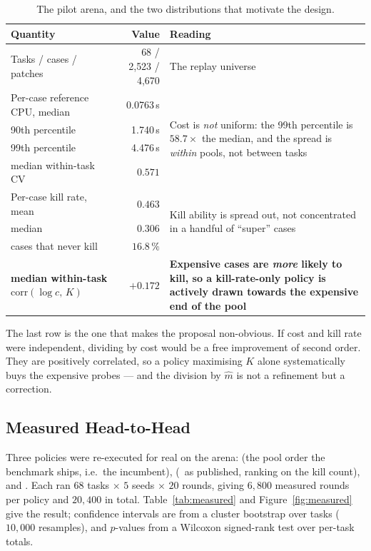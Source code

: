\begin{table}[H]
\centering
\caption{The pilot arena, and the two distributions that motivate the design.}
\label{tab:arena}
\small
\begin{tabularx}{\textwidth}{@{}l r X@{}}
\toprule
Quantity & Value & Reading\\
\midrule
Tasks / cases / patches & 68 / 2{,}523 / 4{,}670 & The replay universe\\
\midrule
Per-case reference CPU, median & 0.0763\,s & \multirow{4}{=}{Cost is \emph{not} uniform: the 99th percentile is $58.7\times$ the median, and the spread is \emph{within} pools, not between tasks}\\
\quad 90th percentile           & 1.740\,s & \\
\quad 99th percentile           & 4.476\,s & \\
\quad median within-task CV     & $0.571$             & \\
\midrule
Per-case kill rate, mean        & $0.463$             & \multirow{3}{=}{Kill ability is spread out, not concentrated in a handful of ``super'' cases}\\
\quad median                    & $0.306$             & \\
\quad cases that never kill     & $16.8\,\%$          & \\
\midrule
\textbf{median within-task $\mathrm{corr}(\log c,\,K)$} & $\bm{+0.172}$ &
\textbf{Expensive cases are \emph{more} likely to kill, so a kill-rate-only
policy is actively drawn towards the expensive end of the pool}\\
\bottomrule
\end{tabularx}
\end{table}

The last row is the one that makes the proposal non-obvious. If cost and kill
rate were independent, dividing by cost would be a free improvement of second
order. They are positively correlated, so a policy maximising $K$ alone
systematically buys the expensive probes --- and the division by $\hat m$ is
not a refinement but a correction.

\subsection{Measured Head-to-Head}
\label{sec:pilot-measured}

Three policies were re-executed for real on the arena:  (the
pool order the benchmark ships, i.e.\ the incumbent), 
(\frtp\ as published, ranking on the kill count), and \km. Each ran $68$ tasks
$\times$ $5$ seeds $\times$ $20$ rounds, giving $6{,}800$ measured rounds per
policy and $20{,}400$ in total. Table~\ref{tab:measured} and
Figure~\ref{fig:measured} give the result; confidence intervals are from a
cluster bootstrap over tasks ($10{,}000$ resamples), and $p$-values from a
Wilcoxon signed-rank test over per-task totals.

